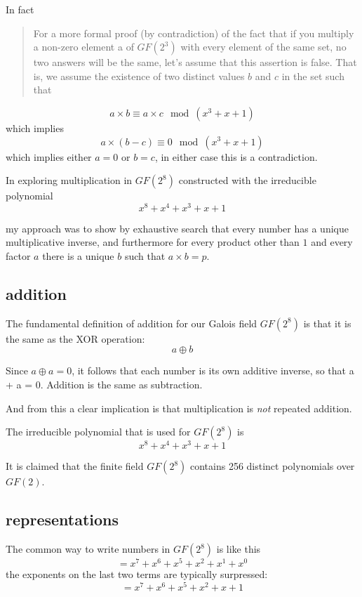 \documentclass[11pt, oneside]{article}
\begin{document}
In fact

\begin{quote}For a more formal proof (by contradiction) of the fact that if you multiply a non-zero element a of $GF(2^3)$ with every element of the same set, no two answers will be the same, let's assume that this assertion is false. That is, we assume the existence of two distinct values $b$ and $c$ in the set such that \end{quote}

\[ a \times b \equiv a \times c \mod (x^3 + x + 1) \]
which implies
\[ a \times (b - c) \equiv 0 \mod (x^3 + x + 1) \]
which implies either $a = 0$ or $b = c$, in either case this is a contradiction.

In exploring multiplication in $GF(2^8)$ constructed with the irreducible polynomial
\[ x^8 + x^4 + x^3 + x + 1 \]

 my approach was to show by exhaustive search that every number has a unique multiplicative inverse, and furthermore for every product other than $1$ and every factor $a$ there is a unique $b$ such that $a \times b = p$.

\subsection*{addition}

The fundamental definition of addition for our Galois field $GF(2^8)$  is that it is the same as the XOR operation:
\[ a \oplus b \]

Since $a \oplus a = 0$, it follows that each number is its own additive inverse, so that a + a = 0.  Addition is the same as subtraction.  

And from this a clear implication is that multiplication is \emph{not} repeated addition.

The irreducible polynomial that is used for $GF(2^8)$ is
\[ x^8 + x^4 + x^3 + x + 1 \]

It is claimed that the finite field $GF(2^8)$ contains 256 distinct polynomials over $GF(2)$.

\subsection*{representations}

The common way to write numbers in $GF(2^8)$ is like this
\[ = x^7 + x^6 + x^5 + x^2 + x^1 + x^0 \]
the exponents on the last two terms are typically surpressed:
\[ =  x^7 + x^6 + x^5 + x^2 + x + 1 \]
\end{document}
